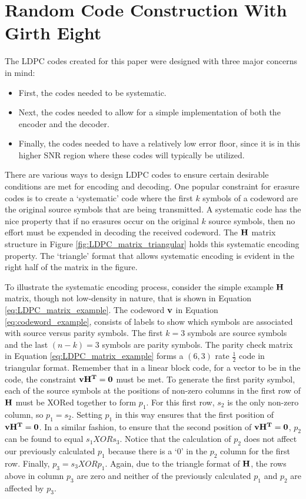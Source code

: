 \documentclass[conference]{IEEEtran}
\begin{document}
\section{Random Code Construction With Girth Eight}\label{sec:LDPC_construction}


The LDPC codes created for this paper were designed with three major concerns in mind:

\begin{itemize}
	\item First, the codes needed to be systematic.
	\item Next, the codes needed to allow for a simple implementation of both the encoder and the decoder.
	\item Finally, the codes needed to have a relatively low error floor, since it is in this higher SNR region where these codes will typically be utilized.
\end{itemize}

There are various ways to design LDPC codes to ensure certain desirable conditions are met for encoding and decoding.  One popular constraint for erasure codes is to create a ‘systematic’ code where the first $k$ symbols of a codeword are the original source symbols that are being transmitted.  A systematic code has the nice property that if no erasures occur on the original $k$ source symbols, then no effort must be expended in decoding the received codeword.  The $\bf{H}$ matrix structure in Figure \ref{fig:LDPC_matrix_triangular} holds this systematic encoding property.  The ‘triangle’ format that allows systematic encoding is evident in the right half of the matrix in the figure.  

To illustrate the systematic encoding process, consider the simple example $\bf{H}$ matrix, though not low-density in nature, that is shown in Equation \ref{eq:LDPC_matrix_example}.  The codeword $\bf{v}$ in Equation \ref{eq:codeword_example}, consists of labels to show which symbols are associated with source versus parity symbols.  The first $k=3$ symbols are source symbols and the last $(n-k)=3$ symbols are parity symbols.  The parity check matrix in Equation \ref{eq:LDPC_matrix_example} forms a $(6, 3)$ rate $\frac{1}{2}$ code in triangular format.  Remember that in a linear block code, for a vector to be in the code, the constraint $\bf{v}\bf{H}^T=\bf{0}$ must be met.  To generate the first parity symbol, each of the source symbols at the positions of non-zero columns in the first row of $\bf{H}$ must be XORed together to form $p_1$.  For this first row, $s_2$ is the only non-zero column, so $p_1 = s_2$.  Setting $p_1$ in this way ensures that the first position of $\bf{v}\bf{H}^T = 0$.  In a similar fashion, to ensure that the second position of $\bf{v}\bf{H}^T = 0$, $p_2$ can be found to equal $s_1 XOR s_3$.  Notice that the calculation of $p_2$ does not affect our previously calculated $p_1$ because there is a ‘0’ in the $p_2$ column for the first row.   Finally, $p_3 = s_3 XOR p_1$.  Again, due to the triangle format of $\bf{H}$, the rows above in column $p_3$ are zero and neither of the previously calculated $p_1$ and $p_2$ are affected by $p_3$.
\end{document}
